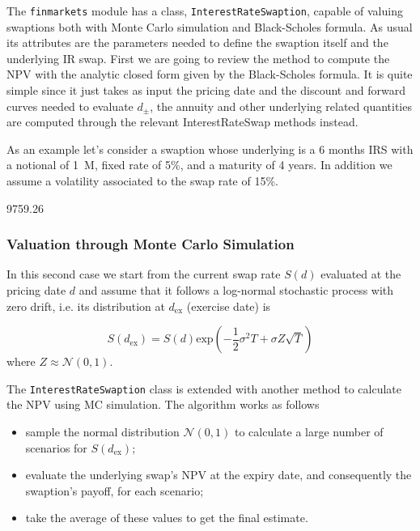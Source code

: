 \begin{finmarkets}
The \texttt{finmarkets} module has a class, \texttt{InterestRateSwaption}, capable of valuing swaptions both with Monte Carlo simulation and Black-Scholes formula. As usual its attributes are the parameters needed to define the swaption itself and the underlying IR swap. First we are going to review the method to compute the NPV with the analytic closed form given by the Black-Scholes formula. It is quite simple since it just takes as input the pricing date and the discount and forward curves needed to evaluate $d_{\pm}$, the annuity and other underlying related quantities are computed through the relevant InterestRateSwap methods instead.
\end{finmarkets}


As an example let's consider a swaption whose underlying is a 6 months IRS with a notional of 1~M, fixed rate of 5\%, and a maturity of 4 years. In addition we assume a volatility associated to the swap rate of 15\%.


\begin{ioutput}
9759.26
\end{ioutput}

\subsubsection{Valuation through Monte Carlo Simulation}
\label{evaluation-through-monte-carlo-simulation}

In this second case we start from the current swap rate $S(d)$ evaluated at the pricing date $d$ and assume that it follows a log-normal stochastic process with zero drift, i.e. its distribution at $d_{\mathrm{ex}}$ (exercise date) is 

\begin{equation*}
S(d_{\mathrm{ex}}) = S(d)\mathrm{exp}(-\frac{1}{2}\sigma^{2}T+\sigma Z\sqrt{T})
\end{equation*}
\noindent
where $Z\approx\mathcal{N}(0,1)$. %

\begin{finmarkets}
The \texttt{InterestRateSwaption} class is extended with another method to calculate the NPV using MC simulation.
The algorithm works as follows

\begin{itemize}
\tightlist
\item sample the normal distribution $\mathcal{N}(0, 1)$ to calculate a large number of scenarios for $S(d_{\mathrm{ex}})$;
\item evaluate the underlying swap's NPV at the expiry date, and consequently the swaption's payoff, for each scenario;
\item take the average of these values to get the final estimate.
\end{itemize}
\end{finmarkets}

